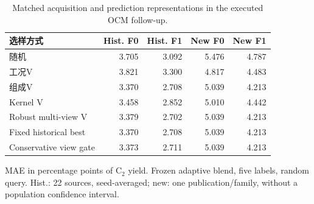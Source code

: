 \begin{table}[htbp]\centering\small
\caption{Matched acquisition and prediction representations in the executed OCM follow-up.}\label{tab:step9matched}
\begin{tabular}{lrrrr}\toprule
选样方式 & Hist. F0 & Hist. F1 & New F0 & New F1 \\ \midrule
随机 & 3.705 & 3.092 & 5.476 & 4.787 \\
工况V & 3.821 & 3.300 & 4.817 & 4.483 \\
组成V & 3.370 & 2.708 & 5.039 & 4.213 \\
Kernel V & 3.458 & 2.852 & 5.010 & 4.442 \\
Robust multi-view V & 3.379 & 2.702 & 5.039 & 4.213 \\
Fixed historical best & 3.370 & 2.708 & 5.039 & 4.213 \\
Conservative view gate & 3.373 & 2.711 & 5.039 & 4.213 \\
\bottomrule\end{tabular}
\par\smallskip\footnotesize MAE in percentage points of C$_2$ yield. Frozen adaptive blend, five labels, random query. Hist.: 22 sources, seed-averaged; new: one publication/family, without a population confidence interval.
\end{table}
